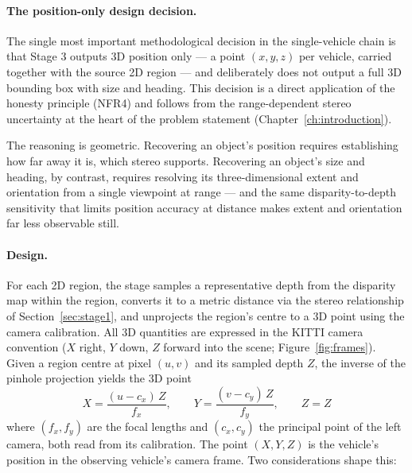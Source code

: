 \paragraph{The position-only design decision.} The single most important
methodological decision in the single-vehicle chain is that Stage 3 outputs 3D
position only --- a point $(x, y, z)$ per vehicle, carried together with the source
2D region --- and deliberately does not output a full 3D bounding box with
size and heading. This decision is a direct application of the honesty principle
(NFR4) and follows from the range-dependent stereo uncertainty at the heart of the
problem statement (Chapter~\ref{ch:introduction}).

The reasoning is geometric. Recovering an object's position requires
establishing how far away it is, which stereo supports. Recovering an object's
size and heading, by contrast, requires resolving its
three-dimensional extent and orientation from a single viewpoint at range --- and
the same disparity-to-depth sensitivity that limits position accuracy at distance
makes extent and orientation far less observable still. 

\paragraph{Design.} For each 2D region, the stage samples a representative depth
from the disparity map within the region, converts it to a metric distance via the
stereo relationship of Section~\ref{sec:stage1}, and unprojects the region's centre
to a 3D point using the camera calibration. All 3D quantities are expressed in the
KITTI camera convention ($X$ right, $Y$ down, $Z$ forward into the scene;
Figure~\ref{fig:frames}). Given a region centre at pixel $(u, v)$ and its sampled
depth $Z$, the inverse of the pinhole projection yields the 3D point
\begin{equation}
X = \frac{(u - c_x)\, Z}{f_x}, \qquad
Y = \frac{(v - c_y)\, Z}{f_y}, \qquad
Z = Z
\label{eq:unproject}
\end{equation}
where $(f_x, f_y)$ are the focal lengths and $(c_x, c_y)$ the principal point of the
left camera, both read from its calibration. The point $(X, Y, Z)$ is the vehicle's
position in the observing vehicle's camera frame. Two considerations shape this:

